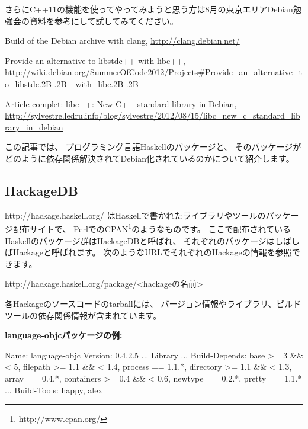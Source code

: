 \documentclass[mingoth,a4paper]{jsarticle}
\begin{document}
さらにC++11の機能を使ってやってみようと思う方は8月の東京エリアDebian勉強会の資料を参考にして試してみてください。

\begin{thebibliography}{9}

Build of the Debian archive with clang, \url{http://clang.debian.net/}

Provide an alternative to libstdc++ with libc++, \url{http://wiki.debian.org/SummerOfCode2012/Projects\#Provide_an_alternative_to_libstdc.2B-.2B-_with_libc.2B-.2B-}

Article complet: libc++: New C++ standard library in Debian, \url{http://sylvestre.ledru.info/blog/sylvestre/2012/08/15/libc_new_c_standard_library_in_debian}

\end{thebibliography}



この記事では、
プログラミング言語Haskellのパッケージと、
そのパッケージがどのように依存関係解決されてDebian化されているのかについて紹介します。


\subsection{HackageDB}

http://hackage.haskell.org/
はHaskellで書かれたライブラリやツールのパッケージ配布サイトで、
PerlでのCPAN{\footnote{http://www.cpan.org/}}のようなものです。
ここで配布されているHaskellのパッケージ群はHackageDBと呼ばれ、
それぞれのパッケージはしばしばHackageと呼ばれます。
次のようなURLでそれぞれのHackageの情報を参照できます。

\begin{commandline}
http://hackage.haskell.org/package/<hackageの名前>
\end{commandline}

各Hackageのソースコードのtarballには、
バージョン情報やライブラリ、ビルドツールの依存関係情報が含まれています。

{\bf language-objcパッケージの例:}

\begin{commandline}
Name:          language-objc
Version:       0.4.2.5
...
Library
...
    Build-Depends: base       >= 3 && < 5,
                   filepath   >= 1.1 && < 1.4,
                   process    == 1.1.*,
                   directory  >= 1.1 && < 1.3,
                   array      == 0.4.*,
                   containers >= 0.4     && < 0.6,
                   newtype    == 0.2.*,
                   pretty     == 1.1.*
...
    Build-Tools:    happy, alex
\end{commandline}
\end{document}

